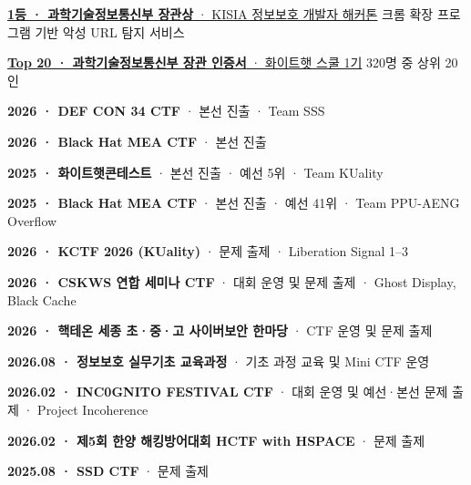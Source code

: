   {\href{https://www.boannews.com/media/view.asp?idx=132213\&direct=mobile}{\textbf{1등 · 과학기술정보통신부 장관상} · KISIA 정보보호 개발자 해커톤}}
  {크롬 확장 프로그램 기반 악성 URL 탐지 서비스}

  {\href{https://www.msit.go.kr/bbs/view.do?sCode=user\&mId=113\&mPid=238\&bbsSeqNo=94\&nttSeqNo=3184227}{\textbf{Top 20 · 과학기술정보통신부 장관 인증서} · 화이트햇 스쿨 1기}}
  {320명 중 상위 20인}


\begin{cvlist}
  \item \textbf{2026 · DEF CON 34 CTF} · 본선 진출 · Team SSS
  \item \textbf{2026 · Black Hat MEA CTF} · 본선 진출
  \item \textbf{2025 · 화이트햇콘테스트} · 본선 진출 · 예선 5위 · Team KUality
  \item \textbf{2025 · Black Hat MEA CTF} · 본선 진출 · 예선 41위 · Team PPU-AENG Overflow
\end{cvlist}


\begin{cvlist}
  \item \textbf{2026 · KCTF 2026 (KUality)} · 문제 출제 · Liberation Signal 1--3
  \item \textbf{2026 · CSKWS 연합 세미나 CTF} · 대회 운영 및 문제 출제 · Ghost Display, Black Cache
  \item \textbf{2026 · 핵테온 세종 초·중·고 사이버보안 한마당} · CTF 운영 및 문제 출제
  \item \textbf{2026.08 · 정보보호 실무기초 교육과정} · 기초 과정 교육 및 Mini CTF 운영
  \item \textbf{2026.02 · INC0GNITO FESTIVAL CTF} · 대회 운영 및 예선·본선 문제 출제 · Project Incoherence
  \item \textbf{2026.02 · 제5회 한양 해킹방어대회 HCTF with HSPACE} · 문제 출제
  \item \textbf{2025.08 · SSD CTF} · 문제 출제
\end{cvlist}

